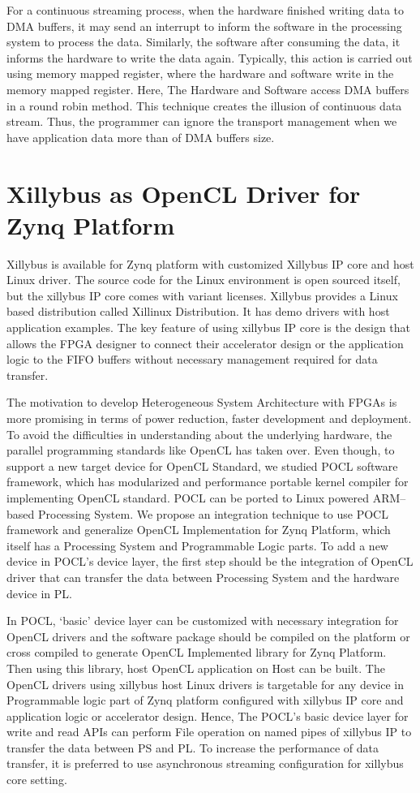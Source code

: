 For a continuous streaming process, when the hardware finished writing data to DMA buffers, it may send an interrupt to inform the software in the processing system to process the data. Similarly, the software after consuming the data, it informs the hardware to write the data again. Typically, this action is carried out using memory mapped register, where the hardware and software write in the memory mapped register. Here, The Hardware and Software access DMA buffers in a round robin method. This technique creates the illusion of continuous data stream. Thus, the programmer can ignore the transport management when we have application data more than of DMA buffers size. 

\section{Xillybus as OpenCL Driver for Zynq Platform}
Xillybus is available for Zynq platform with customized Xillybus IP core and host Linux driver. The source code for the Linux environment is open sourced itself, but the xillybus IP core comes with variant licenses. Xillybus provides a Linux based distribution called Xillinux Distribution. It has demo drivers with host application examples. The key feature of using xillybus IP core is the design that allows the FPGA designer to connect their accelerator design or the application logic to the FIFO buffers without necessary management required for data transfer.

The motivation to develop Heterogeneous System Architecture with FPGAs is more promising in terms of power reduction, faster development and deployment. To avoid the difficulties in understanding about the underlying hardware, the parallel programming standards like OpenCL has taken over. Even though, to support a new target device for OpenCL Standard, we studied POCL software framework, which has modularized and performance portable kernel compiler for implementing OpenCL standard. POCL can be ported to Linux powered ARM--based Processing System. We propose an integration technique to use POCL framework and generalize OpenCL Implementation for Zynq Platform, which itself has a Processing System and Programmable Logic parts. To add a new device in POCL’s device layer, the first step should be the integration of OpenCL driver that can transfer the data between Processing System and the hardware device in PL. 

In POCL, ‘basic’ device layer can be customized with necessary integration for OpenCL drivers and the software package should be compiled on the platform or cross compiled to generate OpenCL Implemented library for Zynq Platform. Then using this library, host OpenCL application on Host can be built. The OpenCL drivers using xillybus host Linux drivers is targetable for any device in Programmable logic part of Zynq platform configured with xillybus IP core and application logic or accelerator design. Hence, The POCL’s basic device layer for write and read APIs can perform File operation on named pipes of xillybus IP to transfer the data between PS and PL. To increase the performance of data transfer, it is preferred to use asynchronous streaming configuration for xillybus core setting.


